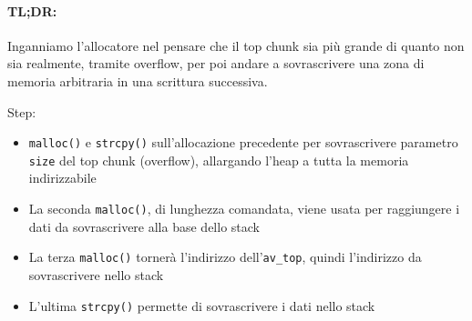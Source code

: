\vfill

\paragraph{TL;DR:} Inganniamo l'allocatore nel pensare che il top chunk sia più grande di quanto non sia realmente, tramite overflow, per poi andare a sovrascrivere una zona di memoria arbitraria in una scrittura successiva.

Step:
\begin{itemize}
    \item \texttt{malloc()} e \texttt{strcpy()} sull'allocazione precedente per sovrascrivere parametro \texttt{size} del top chunk (overflow), allargando l'heap a tutta la memoria indirizzabile
    
    \item La seconda \texttt{malloc()}, di lunghezza comandata, viene usata per raggiungere i dati da sovrascrivere alla base dello stack
    
    \item La terza \texttt{malloc()} tornerà l'indirizzo dell'\texttt{av\_top}, quindi l'indirizzo da sovrascrivere nello stack
    
    \item L'ultima \texttt{strcpy()} permette di sovrascrivere i dati nello stack
\end{itemize}